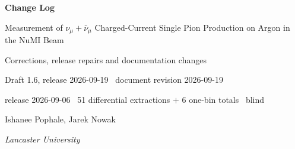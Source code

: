 
\usepackage{xr}





\begin{titlepage}
\centering
\vspace*{2cm}
{\LARGE\bfseries Change Log\par}
\vspace{0.5cm}
{\large Measurement of $\nu_\mu + \bar{\nu}_\mu$ Charged-Current Single Pion
Production on Argon in the NuMI Beam\par}
\vspace{0.8cm}
{\large Corrections, release repairs and documentation changes\par}
\vspace{0.5cm}
{\normalsize Draft 1.6, release 2026-09-19 \textperiodcentered\ document revision 2026-09-19\par}
\vspace{0.15cm}
{\footnotesize\ttfamily release 2026-09-06 \textperiodcentered\ 51 differential extractions $+$ 6 one-bin totals \textperiodcentered\ blind\par}
\vspace{1.5cm}
{\large Ishanee Pophale, Jarek Nowak\par}
\vspace{0.5cm}
{\normalsize\textit{Lancaster University}\par}
\vspace{2cm}

\begin{abstract}
This document records every correction that materially moved a number in the
$\mathrm{CC}\pi^{\pm}$ NuMI analysis, with the value before and after, together with the
release repairs and documentation changes made in the same period; entries of the latter
kind are labelled as such in their headings (``figure only'', ``presentation only'',
``documentation-only'').  It exists so
that a reader of the analysis note never has to work out whether a given table predates
a given fix, and so that a result quoted from an older draft can be identified as
superseded rather than merely different.

Most entries are normalisation errors. The extraction divides by four numbers (the data
exposure, the integrated flux, the argon target count and the per-run Monte Carlo exposure), and
eight separate defects came from one of those four differing between configurations without
anything detecting it.
The response is \texttt{norm\_manifest.py}, which reads the authoritative configuration
files and asserts that they agree, so that a future drift fails a check instead of
producing a wrong cross section.


\end{abstract}
\end{titlepage}

